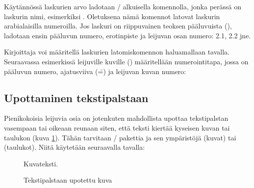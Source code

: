 Käytännössä laskurien arvo ladotaan \-/ alkuisella
komennolla, jonka perässä on laskurin nimi, esimerkiksi
. Oletuksena nämä komennot latovat laskurin
arabialaisilla numeroilla. Jos laskuri on riippuvainen teoksen
pääluvuista (), ladotaan ensin pääluvun numero,
erotinpiste ja leijuvan osan numero: 2.1, 2.2 jne.

Kirjoittaja voi määritellä laskurien latomiskomennon haluamallaan
tavalla. Seuraavassa esimerkissä leijuville kuville ()
määritellään numerointitapa, jossa on pääluvun numero, ajatusviiva (\==)
ja leijuvan kuvan numero:

\begin{koodilohkosis}
\renewcommand{\thefigure}{\thechapter--\arabic{figure}}
\end{koodilohkosis}

\subsection{Upottaminen tekstipalstaan}

Pienikokoisia leijuvia osia on jotenkuten mahdollista upottaa
tekstipalstan vasempaan tai oikeaan reunaan siten, että teksti kiertää
kyseisen kuvan tai taulukon (kuva \ref{kuva/wrapfig-esimerkki}). Tähän
tarvitaan \-/ pakettia ja sen ympäristöjä
 (kuvat) tai  (taulukot).
Niitä käytetään seuraavalla tavalla:

\begin{koodilohkosis}
\begin{figure}
  \caption{Kuvateksti.}
\end{figure}
\end{koodilohkosis}

\begin{figure}
  \caption{Tekstipalstaan upotettu kuva}
  \label{kuva/wrapfig-esimerkki}
\end{figure}

